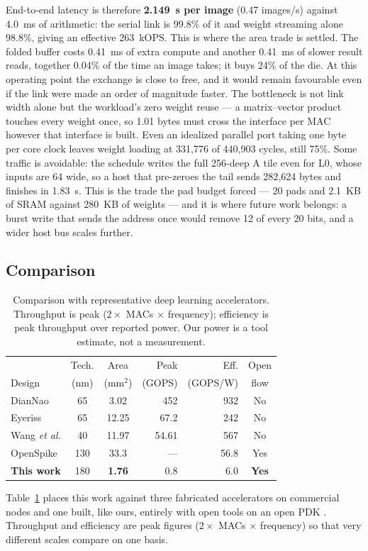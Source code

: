 \documentclass[conference,a4paper]{APSIPA2026}
\begin{document}
End-to-end latency is therefore \textbf{2.149~s per image} (0.47 images/s) against 4.0~ms of arithmetic: the serial link is 99.8\% of it and weight streaming alone 98.8\%, giving an effective 263~kOPS. This is where the area trade is settled. The folded buffer costs 0.41~ms of extra compute and another 0.41~ms of slower result reads, together 0.04\% of the time an image takes; it buys 24\% of the die. At this operating point the exchange is close to free, and it would remain favourable even if the link were made an order of magnitude faster. The bottleneck is not link width alone but the workload's zero weight reuse --- a matrix--vector product touches every weight once, so 1.01 bytes must cross the interface per MAC however that interface is built. Even an idealized parallel port taking one byte per core clock leaves weight loading at 331{,}776 of 440{,}903 cycles, still 75\%. Some traffic is avoidable: the schedule writes the full 256-deep A tile even for L0, whose inputs are 64 wide, so a host that pre-zeroes the tail sends 282{,}624 bytes and finishes in 1.83~s. This is the trade the pad budget forced --- 20 pads and 2.1~KB of SRAM against 280~KB of weights --- and it is where future work belongs: a burst write that sends the address once would remove 12 of every 20 bits, and a wider host bus scales further.

\subsection{Comparison}

\begin{table}[!ht]
\caption{Comparison with representative deep learning accelerators. Throughput is peak ($2\times$ MACs $\times$ frequency); efficiency is peak throughput over reported power. Our power is a tool estimate, not a measurement.}
\label{tab:compare}
\centering
\small
\renewcommand{\arraystretch}{1.12}
\begin{tabular}{@{}lccrrc@{}}
\toprule
 & Tech. & Area & Peak & Eff. & Open \\
Design & (nm) & (mm$^2$) & (GOPS) & (GOPS/W) & flow \\
\midrule
DianNao \cite{diannao}   & 65  & 3.02  & 452   & 932 & No \\
Eyeriss \cite{eyeriss}   & 65  & 12.25 & 67.2  & 242 & No \\
Wang \emph{et al.} \cite{wang} & 40 & 11.97 & 54.61 & 567 & No \\
OpenSpike \cite{openspike} & 130 & 33.3 & ---   & 56.8 & Yes \\
\textbf{This work}       & 180 & \textbf{1.76} & 0.8 & 6.0 & \textbf{Yes} \\
\bottomrule
\end{tabular}
\end{table}
Table~\ref{tab:compare} places this work against three fabricated accelerators on commercial nodes \cite{diannao, eyeriss, wang} and one built, like ours, entirely with open tools on an open PDK \cite{openspike}. Throughput and efficiency are peak figures ($2\times$ MACs $\times$ frequency) so that very different scales compare on one basis.
\end{document}
